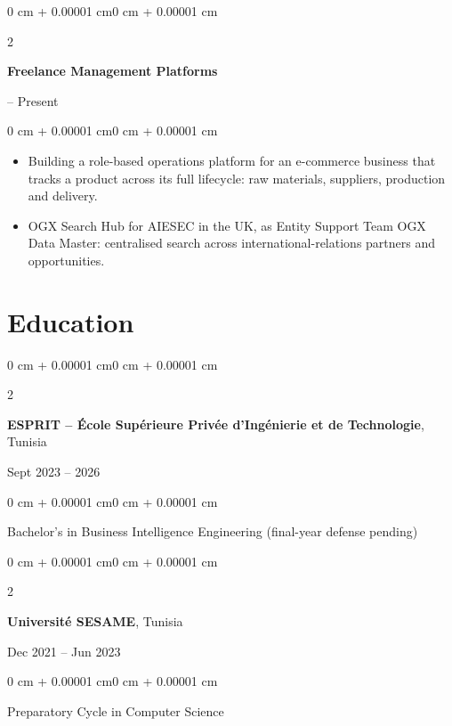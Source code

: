 \documentclass[10pt, letterpaper]{article}
\newenvironment{highlights}{
    \begin{itemize}[
        topsep=0.10 cm,
        parsep=0.10 cm,
        partopsep=0pt,
        itemsep=0pt,
        leftmargin=0 cm + 10pt
    ]
}{
    \end{itemize}
}
\newenvironment{onecolentry}{
    \begin{adjustwidth}{0 cm + 0.00001 cm}{0 cm + 0.00001 cm}
}{
    \end{adjustwidth}
}
\newenvironment{twocolentry}[2][]{
    \onecolentry
    \def\secondColumn{#2}
    \setcolumnwidth{\fill, 4.5 cm}
    \begin{paracol}{2}
}{
    \switchcolumn \raggedleft \secondColumn
    \end{paracol}
    \endonecolentry
}
\begin{document}
\begin{twocolentry}{2025 -- Present}
    \textbf{Freelance Management Platforms}
\end{twocolentry}

\vspace{0.10 cm}

\begin{onecolentry}
    \begin{highlights}
        \item Building a role-based operations platform for an e-commerce business that tracks a
              product across its full lifecycle: raw materials, suppliers, production and delivery.
        \item OGX Search Hub for AIESEC in the UK, as Entity Support Team OGX Data Master:
              centralised search across international-relations partners and opportunities.
    \end{highlights}
\end{onecolentry}

\section{Education}

\begin{twocolentry}{Sept 2023 -- 2026}
    \textbf{ESPRIT -- École Supérieure Privée d'Ingénierie et de Technologie}, Tunisia
\end{twocolentry}

\begin{onecolentry}
    Bachelor's in Business Intelligence Engineering \textnormal{(final-year defense pending)}
\end{onecolentry}

\vspace{0.15 cm}

\begin{twocolentry}{Dec 2021 -- Jun 2023}
    \textbf{Université SESAME}, Tunisia
\end{twocolentry}

\begin{onecolentry}
    Preparatory Cycle in Computer Science
\end{onecolentry}

\vspace{0.15 cm}
\end{document}

